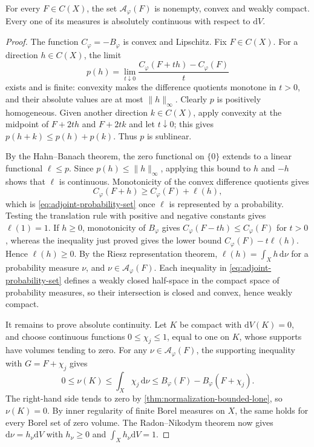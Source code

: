 \begin{theorem}\label{thm:weak-adjoint-probabilities}
For every $F\in C(X)$, the set $\mathcal A_\varphi(F)$ is nonempty, convex and weakly compact. Every one of its measures is absolutely continuous with respect to $\mathrm{d}V$.
\end{theorem}
\begin{proof}
The function $C_\varphi=-B_\varphi$ is convex and Lipschitz. Fix $F\in C(X)$. For a direction $h\in C(X)$, the limit
\[
 p(h)=\lim_{t\downarrow0}
        \frac{C_\varphi(F+th)-C_\varphi(F)}{t}
\]
exists and is finite: convexity makes the difference quotients monotone in $t>0$, and their absolute values are at most $\|h\|_\infty$. Clearly $p$ is positively homogeneous. Given another direction $k\in C(X)$, apply convexity at the midpoint of $F+2th$ and $F+2tk$ and let $t\downarrow0$; this gives $p(h+k)\leq p(h)+p(k)$. Thus $p$ is sublinear.

By the Hahn--Banach theorem, the zero functional on $\{0\}$ extends to a linear functional $\ell\leq p$. Since $p(h)\leq\|h\|_\infty$, applying this bound to $h$ and $-h$ shows that $\ell$ is continuous. Monotonicity of the convex difference quotients gives
\[
 C_\varphi(F+h)\geq C_\varphi(F)+\ell(h),
\]
which is \eqref{eq:adjoint-probability-set} once $\ell$ is represented by a probability. Testing the translation rule with positive and negative constants gives $\ell(1)=1$. If $h\geq0$, monotonicity of $B_\varphi$ gives
$C_\varphi(F-th)\leq C_\varphi(F)$ for $t>0$, whereas the inequality just proved gives the lower bound $C_\varphi(F)-t\ell(h)$. Hence $\ell(h)\geq0$. By the Riesz representation theorem, $\ell(h)=\int_Xh\,\mathrm{d}\nu$ for a probability measure $\nu$, and $\nu\in\mathcal A_\varphi(F)$. Each inequality in \eqref{eq:adjoint-probability-set} defines a weakly closed half-space in the compact space of probability measures, so their intersection is closed and convex, hence weakly compact.

It remains to prove absolute continuity. Let $K$ be compact with $\mathrm{d}V(K)=0$, and choose continuous functions $0\leq\chi_j\leq1$, equal to one on $K$, whose supports have volumes tending to zero. For any $\nu\in\mathcal A_\varphi(F)$, the supporting inequality with $G=F+\chi_j$ gives
\[
 0\leq\nu(K)\leq\int_X\chi_j\,\mathrm{d}\nu
 \leq B_\varphi(F)-B_\varphi(F+\chi_j).
\]
The right-hand side tends to zero by \cref{thm:normalization-bounded-lone}, so $\nu(K)=0$. By inner regularity of finite Borel measures on $X$, the same holds for every Borel set of zero volume. The Radon--Nikodym theorem now gives $\mathrm{d}\nu=h_\nu \mathrm{d}V$ with $h_\nu\geq0$ and $\int_Xh_\nu \mathrm{d}V=1$.
\end{proof}

